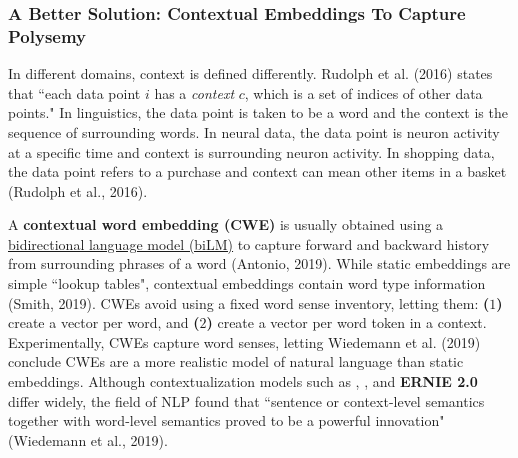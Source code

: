 \subsubsection{A Better Solution: Contextual Embeddings To Capture Polysemy} \label{sec:SolutionWithContextEmbs}


In different domains, context is defined differently. Rudolph et al. (2016) states that ``each data point $i$ has a \emph{context} $c$, which is a set of indices of other data points." In linguistics, the data point is taken to be a word and the context is the sequence of surrounding words. In neural data, the data point is neuron activity at a specific time and context is surrounding neuron activity. In shopping data, the data point refers to a purchase and context can mean other items in a basket (Rudolph et al., 2016). 

A \textbf{contextual word embedding (CWE)} is usually obtained using a \hyperref[sec:BidirectionalLM]{bidirectional language model (biLM)} to capture forward and backward history from surrounding phrases of a word (Antonio, 2019). While static embeddings are simple ``lookup tables", contextual embeddings contain word type information (Smith, 2019). CWEs avoid using a fixed word sense inventory, letting them: \textbf{($1$)} create a vector per word, and \textbf{($2$)} create a vector per word token in a context. Experimentally, CWEs capture word senses, letting Wiedemann et al. (2019) conclude CWEs are a more realistic model of natural language than static embeddings. Although contextualization models such as , , and \textbf{ERNIE 2.0} differ widely, the field of NLP found that ``sentence or context-level semantics together with word-level semantics proved to be a powerful innovation" (Wiedemann et al., 2019). 




